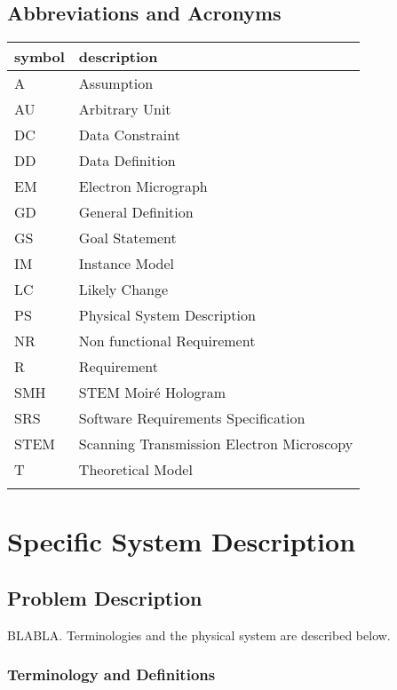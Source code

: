 \documentclass[12pt]{article}
\begin{document}
\subsection{Abbreviations and Acronyms}

\renewcommand{\arraystretch}{1.2}
\begin{tabular}{l l} 
  \toprule		
  \textbf{symbol} & \textbf{description}\\
  \midrule 
  A & Assumption\\
  AU & Arbitrary Unit\\
  DC & Data Constraint \\
  DD & Data Definition\\
  EM & Electron Micrograph \\
  GD & General Definition\\
  GS & Goal Statement\\
  IM & Instance Model\\
  LC & Likely Change\\
  PS & Physical System Description\\
  NR & Non functional Requirement\\
  R & Requirement\\
  SMH & STEM Moir{\'e} Hologram \\
  SRS & Software Requirements Specification\\
  STEM & Scanning Transmission Electron Microscopy \\
  T & Theoretical Model\\
  \bottomrule
  \label{table_acro_SRS}
\end{tabular}

\newpage
{}

\section{Specific System Description}
\subsection{Problem Description} \label{Sec_pd}

BLABLA. Terminologies and the physical system are 
described below.

\subsubsection{Terminology and Definitions}
\end{document}
